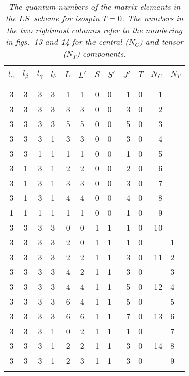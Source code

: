 \clearpage




\begin{table}[hbtp]
\begin{center}
\caption{{\em The quantum numbers of the matrix elements in the $LS$--scheme
for isospin $T = 0$.
The numbers in the
two rightmost columns refer to the numbering in figs.\ 13 and 14
for the central ($N_C$) and tensor ($N_T$) components.}}
\begin{tabular}{ccclrcclrlrl}
&&&&&&&&&&&\\
\hline
&&&&&&&&&&&\\
 $l_{\alpha}$ & $l_{\beta}$ & $l_{\gamma}$ & $l_{\delta}$\hspace{.5cm} &
\hspace{.5cm}$L$ & $L'$ & $S$ & $S'$\hspace{.5cm} &
\hspace{.5cm}$J'$ & $T$\hspace{.5cm} & \hspace{.5cm}$N_C$ &
$N_T$\hspace{.5cm} \\
&&&&&&&&&&&\\
\hline
&&&&&&&&&&&\\
 3 & 3 & 3 & 3 & 1 & 1 & 0 & 0 & 1 & 0 & 1 &  \\
 3 & 3 & 3 & 3 & 3 & 3 & 0 & 0 & 3 & 0 & 2 &  \\
 3 & 3 & 3 & 3 & 5 & 5 & 0 & 0 & 5 & 0 & 3 &  \\
 3 & 3 & 3 & 1 & 3 & 3 & 0 & 0 & 3 & 0 & 4 &  \\
 3 & 3 & 1 & 1 & 1 & 1 & 0 & 0 & 1 & 0 & 5 &  \\
 3 & 1 & 3 & 1 & 2 & 2 & 0 & 0 & 2 & 0 & 6 &  \\
 3 & 1 & 3 & 1 & 3 & 3 & 0 & 0 & 3 & 0 & 7 &  \\
 3 & 1 & 3 & 1 & 4 & 4 & 0 & 0 & 4 & 0 & 8 &  \\
 1 & 1 & 1 & 1 & 1 & 1 & 0 & 0 & 1 & 0 & 9 &  \\
 3 & 3 & 3 & 3 & 0 & 0 & 1 & 1 & 1 & 0 & 10 &  \\
 3 & 3 & 3 & 3 & 2 & 0 & 1 & 1 & 1 & 0 & & 1 \\
 3 & 3 & 3 & 3 & 2 & 2 & 1 & 1 & 3 & 0 & 11 & 2 \\
 3 & 3 & 3 & 3 & 4 & 2 & 1 & 1 & 3 & 0 & & 3 \\
 3 & 3 & 3 & 3 & 4 & 4 & 1 & 1 & 5 & 0 & 12 & 4 \\
 3 & 3 & 3 & 3 & 6 & 4 & 1 & 1 & 5 & 0 & & 5 \\
 3 & 3 & 3 & 3 & 6 & 6 & 1 & 1 & 7 & 0 & 13 & 6 \\
 3 & 3 & 3 & 1 & 0 & 2 & 1 & 1 & 1 & 0 & & 7 \\
 3 & 3 & 3 & 1 & 2 & 2 & 1 & 1 & 3 & 0 & 14 & 8 \\
 3 & 3 & 3 & 1 & 2 & 3 & 1 & 1 & 3 & 0 & & 9 \\
&&&&&&&&&&&\\
\hline
\end{tabular}
\end{center}
\label{tab:lsnum}
\end{table}
